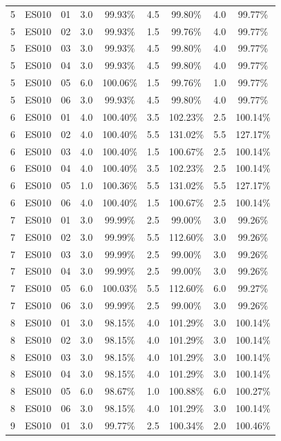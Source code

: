 \documentclass[10pt,a4paper,oneside]{article}
\begin{document}
\begin{longtable}{@{}ccccccccc@{}}
5 & ES010 & 01 & 3.0 & 99.93\% & 4.5 & 99.80\% & 4.0 & 99.77\% \\
5 & ES010 & 02 & 3.0 & 99.93\% & 1.5 & 99.76\% & 4.0 & 99.77\% \\
5 & ES010 & 03 & 3.0 & 99.93\% & 4.5 & 99.80\% & 4.0 & 99.77\% \\
5 & ES010 & 04 & 3.0 & 99.93\% & 4.5 & 99.80\% & 4.0 & 99.77\% \\
5 & ES010 & 05 & 6.0 & 100.06\% & 1.5 & 99.76\% & 1.0 & 99.77\% \\
5 & ES010 & 06 & 3.0 & 99.93\% & 4.5 & 99.80\% & 4.0 & 99.77\% \\
6 & ES010 & 01 & 4.0 & 100.40\% & 3.5 & 102.23\% & 2.5 & 100.14\% \\
6 & ES010 & 02 & 4.0 & 100.40\% & 5.5 & 131.02\% & 5.5 & 127.17\% \\
6 & ES010 & 03 & 4.0 & 100.40\% & 1.5 & 100.67\% & 2.5 & 100.14\% \\
6 & ES010 & 04 & 4.0 & 100.40\% & 3.5 & 102.23\% & 2.5 & 100.14\% \\
6 & ES010 & 05 & 1.0 & 100.36\% & 5.5 & 131.02\% & 5.5 & 127.17\% \\
6 & ES010 & 06 & 4.0 & 100.40\% & 1.5 & 100.67\% & 2.5 & 100.14\% \\
7 & ES010 & 01 & 3.0 & 99.99\% & 2.5 & 99.00\% & 3.0 & 99.26\% \\
7 & ES010 & 02 & 3.0 & 99.99\% & 5.5 & 112.60\% & 3.0 & 99.26\% \\
7 & ES010 & 03 & 3.0 & 99.99\% & 2.5 & 99.00\% & 3.0 & 99.26\% \\
7 & ES010 & 04 & 3.0 & 99.99\% & 2.5 & 99.00\% & 3.0 & 99.26\% \\
7 & ES010 & 05 & 6.0 & 100.03\% & 5.5 & 112.60\% & 6.0 & 99.27\% \\
7 & ES010 & 06 & 3.0 & 99.99\% & 2.5 & 99.00\% & 3.0 & 99.26\% \\
8 & ES010 & 01 & 3.0 & 98.15\% & 4.0 & 101.29\% & 3.0 & 100.14\% \\
8 & ES010 & 02 & 3.0 & 98.15\% & 4.0 & 101.29\% & 3.0 & 100.14\% \\
8 & ES010 & 03 & 3.0 & 98.15\% & 4.0 & 101.29\% & 3.0 & 100.14\% \\
8 & ES010 & 04 & 3.0 & 98.15\% & 4.0 & 101.29\% & 3.0 & 100.14\% \\
8 & ES010 & 05 & 6.0 & 98.67\% & 1.0 & 100.88\% & 6.0 & 100.27\% \\
8 & ES010 & 06 & 3.0 & 98.15\% & 4.0 & 101.29\% & 3.0 & 100.14\% \\
9 & ES010 & 01 & 3.0 & 99.77\% & 2.5 & 100.34\% & 2.0 & 100.46\% \\

\end{longtable}
\end{document}
